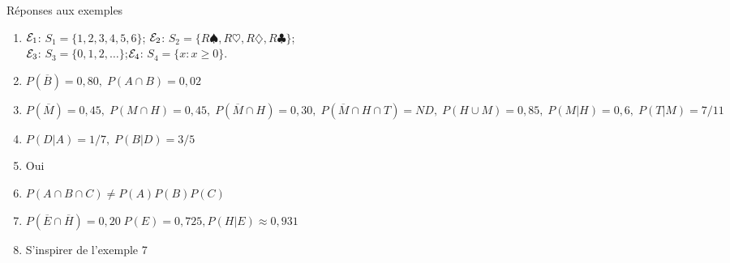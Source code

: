 \documentclass{BeamerTemplate}
\begin{document}
\begin{frame}[t]{Réponses aux exemples}

\footnotesize
\begin{enumerate}
  \item ${\cal{E}}_1$:  $ {{S}}_1=\{1,2,3,4,5,6\}$;  ${\cal{E}}_2$: $  {{S}}_2=\{R\spadesuit,R\heartsuit,R\diamondsuit,R\clubsuit\}$;\\${\cal{E}}_3$: $ {{S}}_3=\{0,1,2,\ldots\}$;${\cal{E}}_4$: $ {{S}}_4=\{x:x\ge0\}$.
  \item $P(\overline B)= 0,80,\; P(A\cap B)=0,02$
  \item $P(\overline M)=0,45,\;P(M\cap H)=0,45,\;P(\overline M\cap H)=0,30, \; P(\overline M\cap H\cap T)=ND,\;P(H\cup M)=0,85,\;P(M|H)=0,6,\;P(T|M)=7/11$
  \item $P(D|A)=1/7,\; P(B|D)=3/5$
  \item Oui
  \item $P(A\cap B\cap C)\ne P(A)P(B)P(C)$
  \item $P(\overline E\cap \overline H)=0,20\; P(E)=0,725, P(H|E)\approx 0,931$
  \item S'inspirer de l'exemple 7
 \end{enumerate}
\end{frame}
\end{document}
